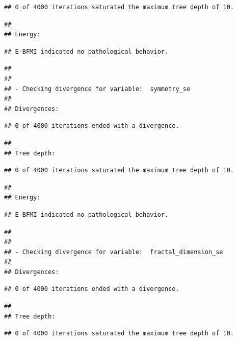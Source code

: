 \documentclass[
]{article}
\begin{document}
\begin{verbatim}
## 0 of 4000 iterations saturated the maximum tree depth of 10.
\end{verbatim}

\begin{verbatim}
## 
## Energy:
\end{verbatim}

\begin{verbatim}
## E-BFMI indicated no pathological behavior.
\end{verbatim}

\begin{verbatim}
## 
## 
## - Checking divergence for variable:  symmetry_se 
## 
## Divergences:
\end{verbatim}

\begin{verbatim}
## 0 of 4000 iterations ended with a divergence.
\end{verbatim}

\begin{verbatim}
## 
## Tree depth:
\end{verbatim}

\begin{verbatim}
## 0 of 4000 iterations saturated the maximum tree depth of 10.
\end{verbatim}

\begin{verbatim}
## 
## Energy:
\end{verbatim}

\begin{verbatim}
## E-BFMI indicated no pathological behavior.
\end{verbatim}

\begin{verbatim}
## 
## 
## - Checking divergence for variable:  fractal_dimension_se 
## 
## Divergences:
\end{verbatim}

\begin{verbatim}
## 0 of 4000 iterations ended with a divergence.
\end{verbatim}

\begin{verbatim}
## 
## Tree depth:
\end{verbatim}

\begin{verbatim}
## 0 of 4000 iterations saturated the maximum tree depth of 10.
\end{verbatim}
\end{document}
